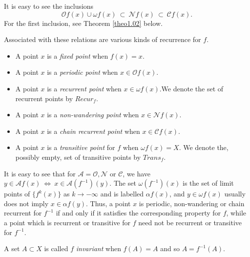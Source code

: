 \documentclass[12pt]{amsart}
\def \A {\mathcal A}
\def \CC {\mathcal C}
\def \NN {\mathcal N}
\def \O {\mathcal O}
\def \a {\alpha }
\def \om {\omega}
\numberwithin{equation}{section}
\begin{document}
It is easy to see the inclusions
\begin{equation}\label{eq1.09}
 \O f(x) \cup \om f(x) \ \subset \ \NN f(x) \ \subset \ \CC f(x).
\end{equation}
For the first inclusion, see Theorem \ref{theo1.02} below.

Associated with these relations are various kinds of recurrence for $f$.
\begin{itemize}
\item A point $x$ is a \emph{fixed point} when $f(x) = x$.

\item A point $x$ is a \emph{periodic point} when $x \in \O f(x)$.

\item A point $x$ is a  \emph{recurrent point} when $x \in \om f(x)$.We denote the set of recurrent points
by $Recur_f$.

\item A point $x$ is a   \emph{non-wandering point}  when $x \in \NN f(x)$.

\item A point $x$ is a   \emph{chain recurrent point}  when $x \in \CC f(x)$.

\item A point $x$ is a  \emph{transitive point} for $f$ when $\om f(x) = X$. We denote the,
possibly empty, set of transitive points by $Trans_f$.
\end{itemize}



It is easy to see that  for $\A = \O, \NN$ or $\CC$, we have $y \in \A f(x) \ \Leftrightarrow \ x \in \A (f^{-1})(y)$.
The set $\om (f^{-1})(x)$ is the set of limit points of $\{ f^k(x) \}$ as $k \to - \infty$ and
is labelled $\a f(x)$, and $y \in \om f(x)$ usually does not imply $x \in \a f(y)$. Thus, a point $x$ is periodic, non-wandering or chain recurrent for $f^{-1}$ if and only if it satisfies the corresponding property for $f$, while a point which is recurrent or transitive for $f$ need not be recurrent or transitive for $f^{-1}.$

A set $A \subset X$ is called $f$ \emph{invariant} when $f(A) = A$ and so $A = f^{-1}(A)$.
\end{document}
